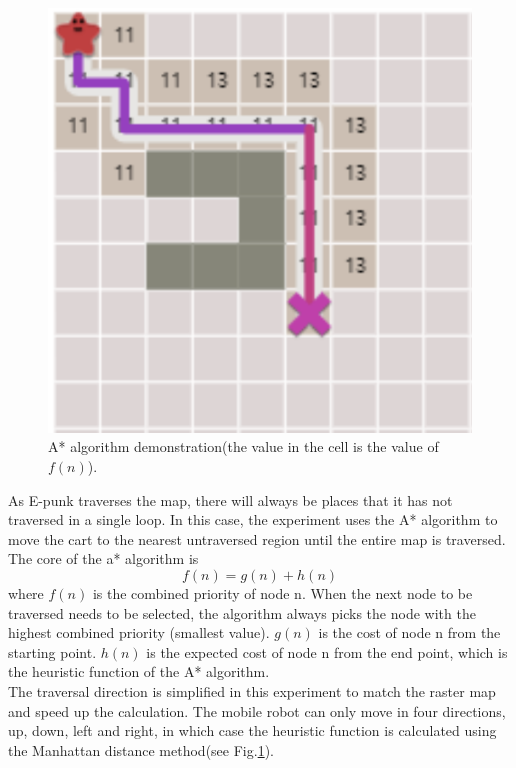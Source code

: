 \documentclass[conference]{IEEEtran}
\begin{document}
\begin{figure}[htbp]
\centerline{\includegraphics[scale=0.45]{RS_Report/astar.png}}
\caption{A* algorithm demonstration(the value in the cell is the value of $f(n)$).}
\label{fig3}
\end{figure}


As E-punk traverses the map, there will always be places that it has not traversed in a single loop. In this case, the experiment uses the A* algorithm to move the cart to the nearest untraversed region until the entire map is traversed.\\
The core of the a* algorithm is
\begin{equation}
    f(n) = g(n) + h(n)
\end{equation}
where $f(n)$ is the combined priority of node n. When the next node to be traversed needs to be selected, the algorithm always picks the node with the highest combined priority (smallest value). $g(n)$ is the cost of node n from the starting point. $h(n)$ is the expected cost of node n from the end point, which is the heuristic function of the A* algorithm.\\
The traversal direction is simplified in this experiment to match the raster map and speed up the calculation. The mobile robot can only move in four directions, up, down, left and right, in which case the heuristic function is calculated using the Manhattan distance method(see Fig.\ref{fig3}).
\end{document}
